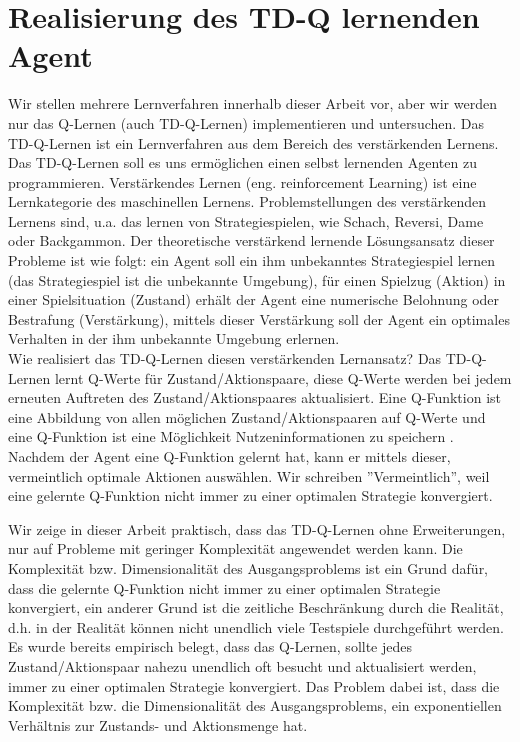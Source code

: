 \section{Realisierung des TD-Q lernenden Agent}
Wir stellen mehrere Lernverfahren innerhalb dieser Arbeit vor, aber wir werden nur das Q-Lernen (auch TD-Q-Lernen) implementieren und untersuchen. Das TD-Q-Lernen ist ein Lernverfahren aus dem Bereich des verstärkenden Lernens. Das TD-Q-Lernen soll es uns ermöglichen einen selbst lernenden Agenten zu programmieren. Verstärkendes Lernen (eng. reinforcement Learning) ist eine Lernkategorie des maschinellen Lernens. Problemstellungen des verstärkenden Lernens sind, u.a. das lernen von Strategiespielen, wie Schach, Reversi, Dame oder Backgammon. Der theoretische verstärkend lernende Lösungsansatz dieser Probleme ist wie folgt: ein Agent soll ein ihm unbekanntes Strategiespiel lernen (das Strategiespiel ist die unbekannte Umgebung), für einen Spielzug  (Aktion) in einer Spielsituation (Zustand) erhält der Agent eine numerische Belohnung oder Bestrafung (Verstärkung), mittels dieser Verstärkung soll der Agent ein optimales Verhalten in der ihm unbekannte Umgebung erlernen.\\

Wie realisiert das TD-Q-Lernen diesen verstärkenden Lernansatz? Das TD-Q-Lernen lernt Q-Werte für Zustand/Aktionspaare, diese Q-Werte werden bei jedem erneuten Auftreten des Zustand/Aktionspaares aktualisiert. Eine Q-Funktion ist eine Abbildung von allen möglichen Zustand/Aktionspaaren auf Q-Werte und eine Q-Funktion ist eine Möglichkeit Nutzeninformationen zu speichern \cite[974]{Russell}. Nachdem der Agent eine Q-Funktion gelernt hat, kann er mittels dieser, vermeintlich optimale Aktionen auswählen. Wir schreiben ''Vermeintlich'', weil eine gelernte Q-Funktion nicht immer zu einer optimalen Strategie konvergiert.

Wir zeige in dieser Arbeit praktisch, dass das TD-Q-Lernen ohne Erweiterungen, nur auf Probleme mit geringer Komplexität angewendet werden kann. Die Komplexität bzw. Dimensionalität des Ausgangsproblems ist ein Grund dafür, dass die gelernte Q-Funktion nicht immer zu einer optimalen Strategie konvergiert, ein anderer Grund ist die zeitliche Beschränkung durch die Realität, d.h. in der Realität können nicht unendlich viele Testspiele durchgeführt werden. Es wurde bereits empirisch belegt, dass das Q-Lernen, sollte jedes Zustand/Aktionspaar nahezu unendlich oft besucht und aktualisiert werden, immer zu einer optimalen Strategie konvergiert. Das Problem dabei ist, dass die Komplexität bzw. die Dimensionalität des Ausgangsproblems, ein exponentiellen Verhältnis zur Zustands- und Aktionsmenge hat. \\

